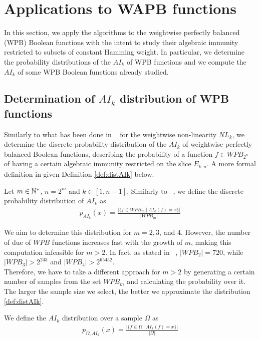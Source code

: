 \documentclass[11pt]{llncs}
\begin{document}
\section{Applications to WAPB functions}
In this section, we apply the algorithms to the weightwise perfectly balanced (WPB) Boolean functions with the intent to study their algebraic immunity restricted to subsets of constant Hamming weight. In particular, we determine the probability distributions of the $AI_k$ of WPB functions and we compute the $AI_k$ of some WPB Boolean functions already studied.

\subsection{Determination of \texorpdfstring{$AI_k$}{AIk} distribution of WPB functions}
Similarly to what has been done in ~\cite{Latin:GinMea23} for the weightwise non-linearity $NL_k$, we determine the discrete probability distribution of the $AI_k$ of weightwise perfectly balanced Boolean functions, describing the probability of a function $f\in WPB_{2^n}$ of having a certain algebraic immunity restricted on the slice $E_{k,n}$. A more formal definition in given Definition \ref{def:distAIk} below.

\begin{definition}\label{def:distAIk}
    Let $m \in \mathbb{N}^*$, $n = 2^m$ and $k \in [1,n-1]$. Similarly to ~\cite{Latin:GinMea23}, we define the discrete probability distribution of $AI_k$ as
    \begin{align*}
        p_{AI_k}(x) = \frac{\bigg|\{f\in WPB_m\  |\  AI_k(f) = x\}\bigg|}{|WPB_m|}
    \end{align*}
\end{definition}

We aim to determine this distribution for $m = 2, 3$, and $4$. However, the number of due of $WPB$ functions increases fast with the growth of $m$, making this computation infeasible for $m > 2$. In fact, as stated in ~\cite{Latin:GinMea23}, $|WPB_2| = 720$, while $|WPB_3| > 2^{243}$ and $|WPB_4| > 2^{65452}$.\\
Therefore, we have to take a different approach for $m > 2$ by generating a certain number of samples from the set $WPB_m$ and calculating the probability over it. The larger the sample size we select, the better we approximate the distribution \ref{def:distAIk}.

\begin{definition}
    We define the $AI_k$ distribution over a sample $\Omega$ as
    \begin{align*}
        p_{\Omega, AI_k}(x) =  \frac{\bigg|\{f\in \Omega\ |\  AI_k(f) = x\}\bigg|}{|\Omega|}
    \end{align*}
\end{definition}
\end{document}
